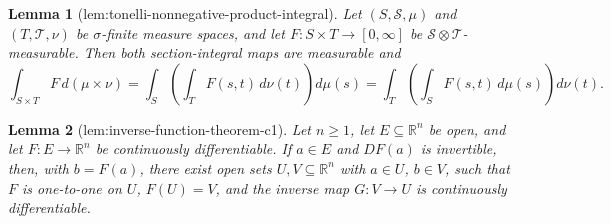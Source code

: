 \documentclass{article}
\newtheorem{lemma}{Lemma}
\begin{document}
\begin{lemma}[lem:tonelli-nonnegative-product-integral]\label{lem:tonelli-nonnegative-product-integral}
Let \((S,\mathcal S,\mu)\) and \((T,\mathcal T,\nu)\) be \(\sigma\)-finite measure spaces, and let \(F:S\times T\to[0,\infty]\) be \(\mathcal S\otimes\mathcal T\)-measurable. Then both section-integral maps are measurable and
\[
\int_{S\times T}F\,d(\mu\times\nu)
=\int_S\!\left(\int_TF(s,t)\,d\nu(t)\right)d\mu(s)
=\int_T\!\left(\int_SF(s,t)\,d\mu(s)\right)d\nu(t).
\]
\end{lemma}

\begin{lemma}[lem:inverse-function-theorem-c1]\label{lem:inverse-function-theorem-c1}
Let \(n\geq1\), let \(E\subseteq\mathbb R^n\) be open, and let \(F:E\to\mathbb R^n\) be continuously differentiable. If \(a\in E\) and \(DF(a)\) is invertible, then, with \(b=F(a)\), there exist open sets \(U,V\subseteq\mathbb R^n\) with \(a\in U\), \(b\in V\), such that \(F\) is one-to-one on \(U\), \(F(U)=V\), and the inverse map \(G:V\to U\) is continuously differentiable.
\end{lemma}
\end{document}
